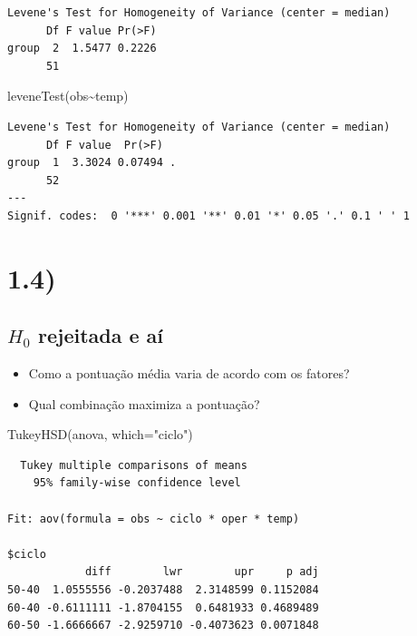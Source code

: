 \documentclass[
  letterpaper,
  DIV=11,
  numbers=noendperiod]{scrartcl}
\newenvironment{Shaded}{\begin{snugshade}}{\end{snugshade}}
\newcommand{\AttributeTok}[1]{\textcolor[rgb]{0.40,0.45,0.13}{#1}}
\newcommand{\FunctionTok}[1]{\textcolor[rgb]{0.28,0.35,0.67}{#1}}
\newcommand{\NormalTok}[1]{\textcolor[rgb]{0.00,0.23,0.31}{#1}}
\newcommand{\SpecialCharTok}[1]{\textcolor[rgb]{0.37,0.37,0.37}{#1}}
\newcommand{\StringTok}[1]{\textcolor[rgb]{0.13,0.47,0.30}{#1}}
\providecommand{\tightlist}{%
  \setlength{\itemsep}{0pt}\setlength{\parskip}{0pt}}\usepackage{longtable,booktabs,array}
\begin{document}
\begin{verbatim}
Levene's Test for Homogeneity of Variance (center = median)
      Df F value Pr(>F)
group  2  1.5477 0.2226
      51               
\end{verbatim}

\begin{Shaded}
\begin{Highlighting}[]
\FunctionTok{leveneTest}\NormalTok{(obs}\SpecialCharTok{\textasciitilde{}}\NormalTok{temp)}
\end{Highlighting}
\end{Shaded}

\begin{verbatim}
Levene's Test for Homogeneity of Variance (center = median)
      Df F value  Pr(>F)  
group  1  3.3024 0.07494 .
      52                  
---
Signif. codes:  0 '***' 0.001 '**' 0.01 '*' 0.05 '.' 0.1 ' ' 1
\end{verbatim}

\hypertarget{section}{%
\section{1.4)}\label{section}}

\hypertarget{h_0-rejeitada-e-auxed}{%
\subsection{\texorpdfstring{\(H_{0}\) rejeitada e
aí}{H\_\{0\} rejeitada e aí}}\label{h_0-rejeitada-e-auxed}}

\begin{itemize}
\tightlist
\item
  Como a pontuação média varia de acordo com os fatores?
\item
  Qual combinação maximiza a pontuação?
\end{itemize}

\begin{Shaded}
\begin{Highlighting}[]
\FunctionTok{TukeyHSD}\NormalTok{(anova, }\AttributeTok{which=}\StringTok{"ciclo"}\NormalTok{)}
\end{Highlighting}
\end{Shaded}

\begin{verbatim}
  Tukey multiple comparisons of means
    95% family-wise confidence level

Fit: aov(formula = obs ~ ciclo * oper * temp)

$ciclo
            diff        lwr        upr     p adj
50-40  1.0555556 -0.2037488  2.3148599 0.1152084
60-40 -0.6111111 -1.8704155  0.6481933 0.4689489
60-50 -1.6666667 -2.9259710 -0.4073623 0.0071848
\end{verbatim}
\end{document}
